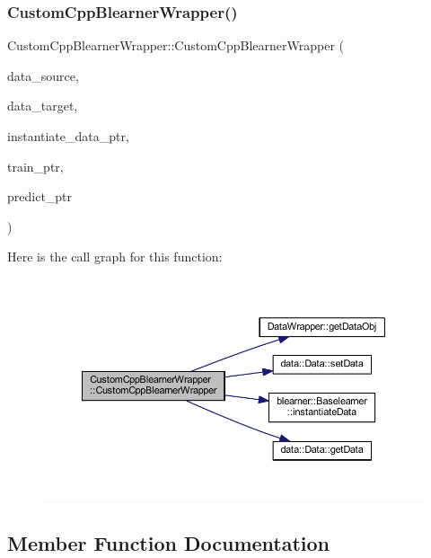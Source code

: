 \subsubsection{\texorpdfstring{Custom\+Cpp\+Blearner\+Wrapper()}{CustomCppBlearnerWrapper()}}
{\footnotesize\ttfamily Custom\+Cpp\+Blearner\+Wrapper\+::\+Custom\+Cpp\+Blearner\+Wrapper (\begin{DoxyParamCaption}\item[{\mbox{\hyperlink{class_data_wrapper}{Data\+Wrapper}} \&}]{data\+\_\+source,  }\item[{\mbox{\hyperlink{class_data_wrapper}{Data\+Wrapper}} \&}]{data\+\_\+target,  }\item[{S\+E\+XP}]{instantiate\+\_\+data\+\_\+ptr,  }\item[{S\+E\+XP}]{train\+\_\+ptr,  }\item[{S\+E\+XP}]{predict\+\_\+ptr }\end{DoxyParamCaption})\hspace{0.3cm}{\ttfamily [inline]}}

Here is the call graph for this function\+:\nopagebreak
\begin{figure}[H]
\begin{center}
\leavevmode
\includegraphics[width=350pt]{class_custom_cpp_blearner_wrapper_af5083cc4ff105d0818b7443f228d09ab_cgraph}
\end{center}
\end{figure}


\subsection{Member Function Documentation}
\mbox{\label{class_custom_cpp_blearner_wrapper_a015410ca4260c3e5586ab7923ef2d624}} 
